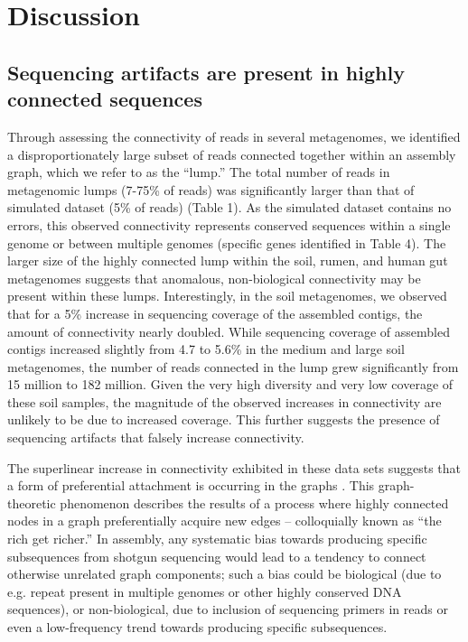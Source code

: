 \documentclass[10pt]{article}
\begin{document}
\section*{Discussion}

\subsection*{Sequencing artifacts are present in highly connected sequences}

Through assessing the connectivity of reads in several metagenomes, we
identified a disproportionately large subset of reads
connected together within an assembly graph, which we refer to as
the ``lump.''
The total number of reads in
metagenomic lumps (7-75\% of reads) was significantly larger than that
of simulated dataset (5\% of reads) (Table 1).  As the simulated
dataset contains no errors, this observed connectivity represents
conserved sequences within a single genome or between multiple genomes
(specific genes identified in Table 4).  The larger size of the highly
connected lump within the soil, rumen, and human gut metagenomes
suggests that anomalous, non-biological connectivity may be present
within these lumps.  Interestingly, in the soil metagenomes, we
observed that for a 5\% increase in sequencing coverage of the assembled
contigs, the amount of connectivity nearly doubled.
While sequencing coverage of assembled contigs
increased slightly from 4.7 to 5.6\% in the medium and large soil
metagenomes, the number of reads connected in the lump grew
significantly from 15 million to 182 million.  Given the very high
diversity and very low coverage of these soil samples, the magnitude of the
observed increases in connectivity are unlikely to be due to increased
coverage.  This further suggests the presence of sequencing artifacts
that falsely increase connectivity.

The superlinear increase in connectivity exhibited in these data sets
suggests that a form of preferential attachment is occurring in the
graphs \cite{Barabasi:1999p1083}.  This graph-theoretic phenomenon
describes the results of a process where highly connected nodes in a
graph preferentially acquire new edges -- colloquially known as ``the
rich get richer.''  In assembly, any systematic bias towards producing
specific subsequences from shotgun sequencing would lead to a tendency
to connect otherwise unrelated graph components; such a bias could be
biological (due to e.g. repeat present in multiple genomes or other
highly conserved DNA sequences), or non-biological, due to inclusion
of sequencing primers in reads or even a low-frequency trend towards
producing specific subsequences.
\end{document}
